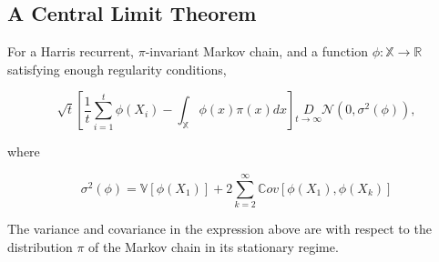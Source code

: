 \documentclass[10pt]{article}
\begin{document}
\subsection{A Central Limit Theorem} 
For a Harris recurrent, $\pi$-invariant Markov chain, and a function $\phi: \mathbb{X} \rightarrow \mathbb{R}$ satisfying enough regularity conditions,

$$
\sqrt{t}\left[\frac{1}{t} \sum_{i=1}^{t} \phi\left(X_{i}\right)-\int_{\mathbb{X}} \phi(x) \pi(x) d x\right] \underset{t \rightarrow \infty}{D} \mathcal{N}\left(0, \sigma^{2}(\phi)\right),
$$

where

$$
\sigma^{2}(\phi)=\mathbb{V}\left[\phi\left(X_{1}\right)\right]+2 \sum_{k=2}^{\infty} \mathbb{C} o v\left[\phi\left(X_{1}\right), \phi\left(X_{k}\right)\right]
$$

The variance and covariance in the expression above are with respect to the distribution $\pi$ of the Markov chain in its stationary regime.
\end{document}
